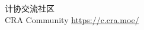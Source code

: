 \documentclass{libs/SUSTech_format}
\begin{document}
{\begin{frame}{}
\begin{columns}
            \Large 计协交流社区 \\ CRA Community \url{https://c.cra.moe/}
        \end{columns}
        
    \end{frame}
}
\end{document}

